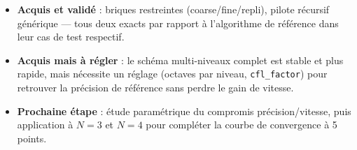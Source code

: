 \documentclass[11pt]{article}
\newcommand{\code}[1]{\texttt{#1}}
\begin{document}
\begin{itemize}
  \item \textbf{Acquis et validé} : briques restreintes (coarse/fine/repli),
  pilote récursif générique --- tous deux exacts par rapport à
  l'algorithme de référence dans leur cas de test respectif.
  \item \textbf{Acquis mais à régler} : le schéma multi-niveaux complet
  est stable et plus rapide, mais nécessite un réglage
  (octaves par niveau, \code{cfl\_factor}) pour retrouver la précision de
  référence sans perdre le gain de vitesse.
  \item \textbf{Prochaine étape} : étude paramétrique du compromis
  précision/vitesse, puis application à $N=3$ et $N=4$ pour compléter la
  courbe de convergence à 5 points.
\end{itemize}
\end{document}
